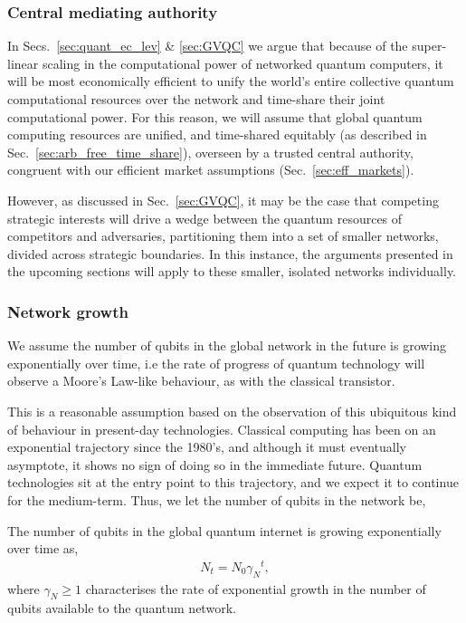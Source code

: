 \subsubsection{Central mediating authority}

In Secs.~\ref{sec:quant_ec_lev} \& \ref{sec:GVQC} we argue that because of the super-linear scaling in the computational power of networked quantum computers, it will be most economically efficient to unify the world's entire collective quantum computational resources over the network and time-share their joint computational power. For this reason, we will assume that global quantum computing resources are unified, and time-shared equitably (as described in Sec.~\ref{sec:arb_free_time_share}), overseen by a trusted central authority, congruent with our efficient market assumptions (Sec.~\ref{sec:eff_markets}).

However, as discussed in Sec.~\ref{sec:GVQC}, it may be the case that competing strategic interests will drive a wedge between the quantum resources of competitors and adversaries, partitioning them into a set of smaller networks, divided across strategic boundaries. In this instance, the arguments presented in the upcoming sections will apply to these smaller, isolated networks individually.

%
%

\subsubsection{Network growth} 

We assume the number of qubits in the global network in the future is growing exponentially over time, i.e the rate of progress of quantum technology will observe a Moore's Law-like behaviour, as with the classical transistor.

This is a reasonable assumption based on the observation of this ubiquitous kind of behaviour in present-day technologies. Classical computing has been on an exponential trajectory since the 1980's, and although it must eventually asymptote, it shows no sign of doing so in the immediate future. Quantum technologies sit at the entry point to this trajectory, and we expect it to continue for the medium-term. Thus, we let the number of qubits in the network be,
\begin{postulate}\label{post:net_growth}
The number of qubits in the global quantum internet is growing exponentially over time as,
\begin{align}
	N_t = N_0 {\gamma_N}^{t},
\end{align}
where \mbox{$\gamma_N\geq 1$} characterises the rate of exponential growth in the number of qubits available to the quantum network.
\end{postulate}


